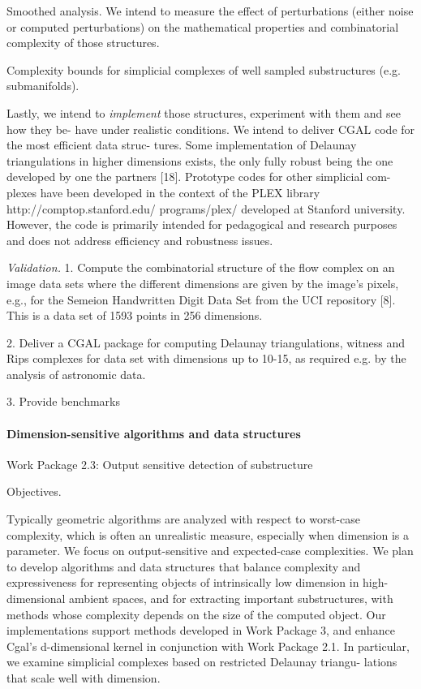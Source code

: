 Smoothed analysis. We intend to measure the effect of perturbations (either noise or computed perturbations) on the mathematical properties and combinatorial complexity of those structures.

Complexity  bounds for simplicial complexes of well sampled substructures (e.g. submanifolds).



Lastly, we intend to {\em implement} those structures, experiment with them and see how they be- have under realistic conditions. We intend to deliver CGAL code for the most efficient data struc- tures. Some implementation of Delaunay triangulations in higher dimensions exists, the only fully robust being the one developed by one the partners [18]. Prototype codes for other simplicial com- plexes have been developed in the context of the PLEX library http://comptop.stanford.edu/ programs/plex/ developed at Stanford university. However, the code is primarily intended for pedagogical and research purposes and does not address efficiency and robustness issues.

{\em Validation.}
1. Compute the combinatorial structure of the flow complex on an image data sets where the different dimensions are given by the image’s pixels, e.g., for the Semeion Handwritten Digit Data Set from the UCI repository [8]. This is a data set of 1593 points in 256 dimensions.

2. Deliver a CGAL package for computing Delaunay triangulations, witness and Rips complexes for data set with dimensions up to 10-15, as required e.g. by the analysis of astronomic data.

3. Provide benchmarks

\paragraph{Dimension-sensitive algorithms and data structures}

Work Package 2.3: Output sensitive detection of substructure

Objectives. 

Typically geometric algorithms are analyzed with respect to worst-case complexity, which is often an unrealistic measure, especially when dimension is a parameter. We focus on output-sensitive and expected-case complexities. We plan to develop algorithms and data structures that balance complexity and expressiveness for representing objects of intrinsically low dimension in high-dimensional ambient spaces, and for extracting important substructures, with methods whose complexity depends on the size of the computed object. Our implementations support methods developed in Work Package 3, and enhance Cgal’s d-dimensional kernel in conjunction with Work Package 2.1. In particular, we examine simplicial complexes based on restricted Delaunay triangu- lations that scale well with dimension.

